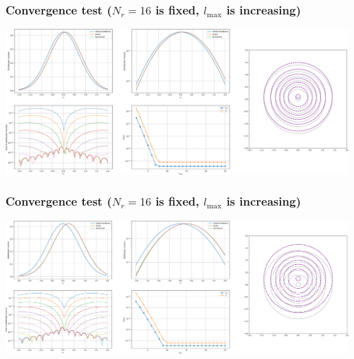 \documentclass[mathserif, aspectratio=169]{beamer}
\newcommand{\vect}[1]{\boldsymbol{#1}}
\newcommand{\of}[1]{\mleft( #1 \mright)}
\begin{document}
\begin{frame}
\frametitle{\small Convergence test ($N_r = 16$ is fixed, $l_{\max}$ is increasing)}
\begin{center}
\includegraphics[width=0.99\textwidth]{figures/advection_operator_changing_lmax_0_1}
\end{center}
\end{frame}

\begin{frame}
\frametitle{\small Convergence test ($N_r = 16$ is fixed, $l_{\max}$ is increasing)}
\begin{center}
\includegraphics[width=0.99\textwidth]{figures/advection_operator_changing_lmax_0_25}
\end{center}
\end{frame}
\end{document}
